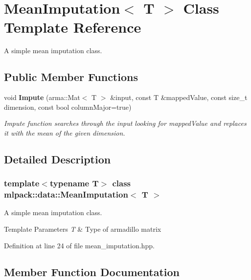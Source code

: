 \section{Mean\+Imputation$<$ T $>$ Class Template Reference}
\label{classmlpack_1_1data_1_1MeanImputation}


A simple mean imputation class.  


\subsection*{Public Member Functions}
\begin{DoxyCompactItemize}
\item 
void \textbf{ Impute} (arma\+::\+Mat$<$ T $>$ \&input, const T \&mapped\+Value, const size\+\_\+t dimension, const bool column\+Major=true)
\begin{DoxyCompactList}\small\item\em Impute function searches through the input looking for mapped\+Value and replaces it with the mean of the given dimension. \end{DoxyCompactList}\end{DoxyCompactItemize}


\subsection{Detailed Description}
\subsubsection*{template$<$typename T$>$\newline
class mlpack\+::data\+::\+Mean\+Imputation$<$ T $>$}

A simple mean imputation class. 


\begin{DoxyTemplParams}{Template Parameters}
{\em T} & Type of armadillo matrix \\
\hline
\end{DoxyTemplParams}


Definition at line 24 of file mean\+\_\+imputation.\+hpp.



\subsection{Member Function Documentation}
\mbox{\label{classmlpack_1_1data_1_1MeanImputation_a94b8353ed4d68b10e2dd59d5e7dc15ca}} 
